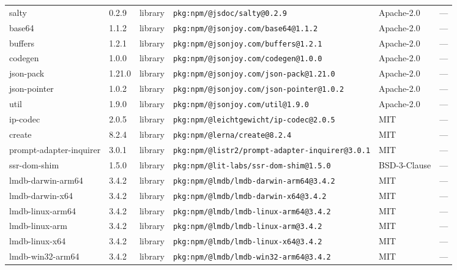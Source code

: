 \documentclass[11pt,a4paper]{article}
\begin{document}
\begin{longtable}{|p{4cm}|p{2cm}|p{1.6cm}|p{5cm}|p{1.5cm}|p{3.5cm}|}
\raggedright salty & 0.2.9 & library & \small\texttt{pkg:npm/@jsdoc/salty@0.2.9} & Apache-2.0 & \small — \\
\raggedright base64 & 1.1.2 & library & \small\texttt{pkg:npm/@jsonjoy.com/base64@1.1.2} & Apache-2.0 & \small — \\
\raggedright buffers & 1.2.1 & library & \small\texttt{pkg:npm/@jsonjoy.com/buffers@1.2.1} & Apache-2.0 & \small — \\
\raggedright codegen & 1.0.0 & library & \small\texttt{pkg:npm/@jsonjoy.com/codegen@1.0.0} & Apache-2.0 & \small — \\
\raggedright json-pack & 1.21.0 & library & \small\texttt{pkg:npm/@jsonjoy.com/json-pack@1.21.0} & Apache-2.0 & \small — \\
\raggedright json-pointer & 1.0.2 & library & \small\texttt{pkg:npm/@jsonjoy.com/json-pointer@1.0.2} & Apache-2.0 & \small — \\
\raggedright util & 1.9.0 & library & \small\texttt{pkg:npm/@jsonjoy.com/util@1.9.0} & Apache-2.0 & \small — \\
\raggedright ip-codec & 2.0.5 & library & \small\texttt{pkg:npm/@leichtgewicht/ip-codec@2.0.5} & MIT & \small — \\
\raggedright create & 8.2.4 & library & \small\texttt{pkg:npm/@lerna/create@8.2.4} & MIT & \small — \\
\raggedright prompt-adapter-inquirer & 3.0.1 & library & \small\texttt{pkg:npm/@listr2/prompt-adapter-inquirer@3.0.1} & MIT & \small — \\
\raggedright ssr-dom-shim & 1.5.0 & library & \small\texttt{pkg:npm/@lit-labs/ssr-dom-shim@1.5.0} & BSD-3-Clause & \small — \\
\raggedright lmdb-darwin-arm64 & 3.4.2 & library & \small\texttt{pkg:npm/@lmdb/lmdb-darwin-arm64@3.4.2} & MIT & \small — \\
\raggedright lmdb-darwin-x64 & 3.4.2 & library & \small\texttt{pkg:npm/@lmdb/lmdb-darwin-x64@3.4.2} & MIT & \small — \\
\raggedright lmdb-linux-arm64 & 3.4.2 & library & \small\texttt{pkg:npm/@lmdb/lmdb-linux-arm64@3.4.2} & MIT & \small — \\
\raggedright lmdb-linux-arm & 3.4.2 & library & \small\texttt{pkg:npm/@lmdb/lmdb-linux-arm@3.4.2} & MIT & \small — \\
\raggedright lmdb-linux-x64 & 3.4.2 & library & \small\texttt{pkg:npm/@lmdb/lmdb-linux-x64@3.4.2} & MIT & \small — \\
\raggedright lmdb-win32-arm64 & 3.4.2 & library & \small\texttt{pkg:npm/@lmdb/lmdb-win32-arm64@3.4.2} & MIT & \small — \\

\end{longtable}
\end{document}
